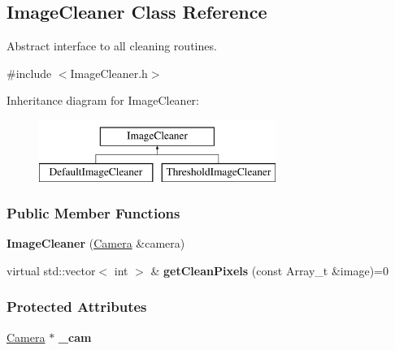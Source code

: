 \hypertarget{classImageCleaner}{
\subsection{ImageCleaner Class Reference}
\label{classImageCleaner}
}


Abstract interface to all cleaning routines.  




{\ttfamily \#include $<$ImageCleaner.h$>$}

Inheritance diagram for ImageCleaner:\begin{figure}[H]
\begin{center}
\leavevmode
\includegraphics[height=2.000000cm]{classImageCleaner}
\end{center}
\end{figure}
\subsubsection*{Public Member Functions}
\begin{DoxyCompactItemize}
\item 
\hypertarget{classImageCleaner_a027c43146b1e5ab91b8f982b3963b3c9}{
{\bfseries ImageCleaner} (\hyperlink{classCamera}{Camera} \&camera)}
\label{classImageCleaner_a027c43146b1e5ab91b8f982b3963b3c9}

\item 
\hypertarget{classImageCleaner_a05208229b8c2d7bfb618b809d31f849f}{
virtual std::vector$<$ int $>$ \& {\bfseries getCleanPixels} (const Array\_\-t \&image)=0}
\label{classImageCleaner_a05208229b8c2d7bfb618b809d31f849f}

\end{DoxyCompactItemize}
\subsubsection*{Protected Attributes}
\begin{DoxyCompactItemize}
\item 
\hypertarget{classImageCleaner_ad5416a673ec07df1ef62baaf5370f844}{
\hyperlink{classCamera}{Camera} $\ast$ {\bfseries \_\-cam}}
\label{classImageCleaner_ad5416a673ec07df1ef62baaf5370f844}

\end{DoxyCompactItemize}


